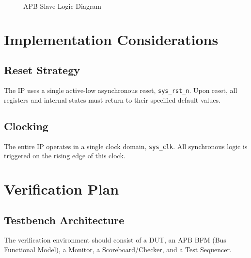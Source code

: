 \documentclass[11pt, a4paper]{article}
\begin{document}
\begin{figure}[H]
    \centering
    \caption{APB Slave Logic Diagram}
    \label{fig:apb_logic}
\end{figure}

\section{Implementation Considerations}

\subsection{Reset Strategy}
The IP uses a single active-low asynchronous reset, \texttt{sys\_rst\_n}. Upon reset, all registers and internal states must return to their specified default values.

\subsection{Clocking}
The entire IP operates in a single clock domain, \texttt{sys\_clk}. All synchronous logic is triggered on the rising edge of this clock.

\section{Verification Plan}

\subsection{Testbench Architecture}
The verification environment should consist of a DUT, an APB BFM (Bus Functional Model), a Monitor, a Scoreboard/Checker, and a Test Sequencer.
\end{document}
